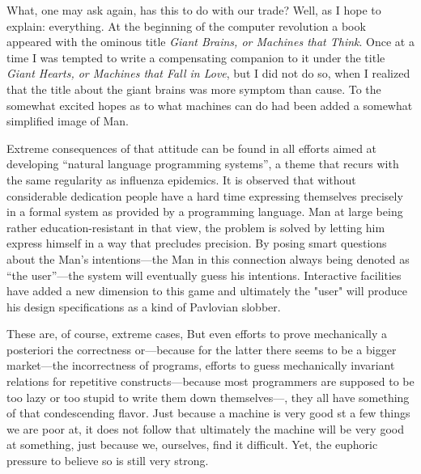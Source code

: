 \documentclass[12pt,letterpaper]{article}
\begin{document}
What, one may ask again, has this to do with 
our trade? Well, as I hope to explain: everything. 
At the beginning of the computer revolution a book 
appeared with the ominous title \textsl{Giant Brains, or 
Machines that Think}. Once at a time I was tempted 
to write a compensating companion to it under the 
title \textsl{Giant Hearts, or Machines that Fall in Love}, 
but I did not do so, when I realized that the title 
about the giant brains was more symptom than cause. 
To the somewhat excited hopes as to what machines 
can do had been added a somewhat simplified image 
of Man. 

Extreme consequences of that attitude can be found in all efforts aimed at
developing ``natural language programming systems'', a theme that recurs with
the same regularity as influenza epidemics. It is observed that without
considerable dedication people have a hard time expressing themselves precisely
in a formal system as provided by a programming language. Man at large being
rather education-resistant in that view, the problem is solved by letting him
express himself in a way that precludes precision. By posing smart questions
about the Man's intentions---the Man in this connection always being denoted as
``the user''---the system will eventually guess his intentions. Interactive
facilities have added a new dimension to this game and ultimately the "user"
will produce his design specifications as a kind of Pavlovian slobber. 

These are, of course, extreme cases, But even efforts to prove mechanically a
posteriori the correctness or---because for the latter there seems to be a
bigger market---the incorrectness of programs, efforts to guess mechanically
invariant relations for repetitive constructs---because most programmers are
supposed to be too lazy or too stupid to write them down themselves---, they
all have something of that condescending flavor. Just because a machine is
very good st a few things we are poor at, it does not follow that ultimately
the machine will be very good at something, just because we, ourselves, find it
difficult. Yet, the euphoric pressure to believe so is still very strong. 
\end{document}
